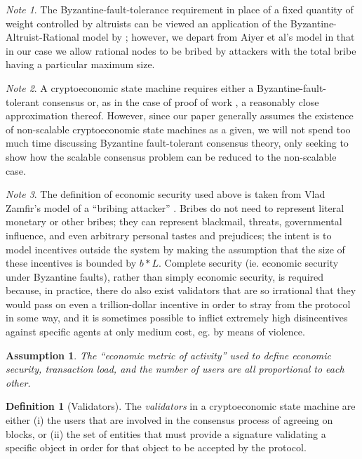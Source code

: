 \documentclass[11pt,a4paper]{report}
\theoremstyle{plain}
\newtheorem{assm}{Assumption}[chapter]
\theoremstyle{definition}
\newtheorem{defn}{Definition}[chapter]
\theoremstyle{remark}
\newtheorem*{note}{Note}
\begin{document}
\begin{note}
The Byzantine-fault-tolerance requirement in place of a fixed quantity of weight controlled by altruists can be viewed an application of the Byzantine-Altruist-Rational model by \cite{aiyer_bar_2005}; however, we depart from Aiyer et al's model in that in our case we allow rational nodes to be bribed by attackers with the total bribe having a particular maximum size.
\end{note}

\begin{note}
A cryptoeconomic state machine requires either a Byzantine-fault-tolerant consensus or, as in the case of proof of work \citep{miller_anonymous_2014}, a reasonably close approximation thereof. However, since our paper generally assumes the existence of non-scalable cryptoeconomic state machines as a given, we will not spend too much time discussing Byzantine fault-tolerant consensus theory, only seeking to show how the scalable consensus problem can be reduced to the non-scalable case.
\end{note}

\begin{note}
The definition of economic security used above is taken from Vlad Zamfir's model of a ``bribing attacker'' \citep{zamfir_formalizing_2015}. Bribes do not need to represent literal monetary or other bribes; they can represent blackmail, threats, governmental influence, and even arbitrary personal tastes and prejudices; the intent is to model incentives outside the system by making the assumption that the size of these incentives is bounded by $b * L$. Complete security (ie. economic security under Byzantine faults), rather than simply economic security, is required because, in practice, there do also exist validators that are so irrational that they would pass on even a trillion-dollar incentive in order to stray from the protocol in some way, and it is sometimes possible to inflict extremely high disincentives against specific agents at only medium cost, eg. by means of violence.
\end{note}

\begin{assm}
The ``economic metric of activity'' used to define economic security, transaction load, and the number of users are all proportional to each other.
\end{assm}

\begin{defn}[Validators]
The \emph{validators} in a cryptoeconomic state machine are either (i) the users that are involved in the consensus process of agreeing on blocks, or (ii) the set of entities that must provide a signature validating a specific object in order for that object to be accepted by the protocol.
\end{defn}
\end{document}
